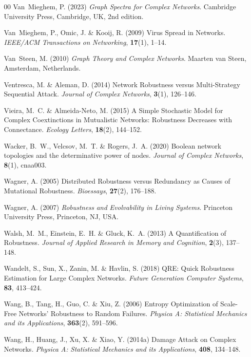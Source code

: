 \documentclass{comnet-mod}
\begin{document}
\begin{thebibliography}{00}
Van~Mieghem, P. (2023) {\em {Graph Spectra for Complex Networks}}.
{Cambridge University Press}, {Cambridge, UK}, 2nd edition.

Van~Mieghem, P., Omic, J. {\&} Kooij, R. (2009)  {Virus Spread in Networks}.
  {\em {IEEE/ACM Transactions on Networking}}, \textbf{17}(1), 1--14.

Van~Steen, M. (2010) {\em {Graph {{Theory}} and {{Complex Networks}}}}.
{Maarten van Steen}, {Amsterdam, Netherlands}.

Ventresca, M. {\&} Aleman, D. (2014)  {Network Robustness versus Multi-Strategy
  Sequential Attack}. {\em {Journal of Complex Networks}}, \textbf{3}(1),
  126--146.

Vieira, M.~C. {\&} {Almeida-Neto}, M. (2015)  {A Simple Stochastic Model for
  Complex Coextinctions in Mutualistic Networks: {{Robustness}} Decreases with
  Connectance}. {\em {Ecology Letters}}, \textbf{18}(2), 144--152.

Wacker, B.~W., Velcsov, M.~T. {\&} Rogers, J.~A. (2020)  Boolean network
  topologies and the determinative power of nodes. {\em {Journal of Complex
  Networks}}, \textbf{8}(1), cnaa003.

Wagner, A. (2005)  {Distributed Robustness versus Redundancy as Causes of
  Mutational Robustness}. {\em {Bioessays}}, \textbf{27}(2), 176--188.

Wagner, A. (2007) {\em {Robustness and Evolvability in Living Systems}}.
{Princeton University Press}, {Princeton, NJ, USA}.

Walsh, M.~M., Einstein, E.~H. {\&} Gluck, K.~A. (2013)  {A Quantification of
  Robustness}. {\em {Journal of Applied Research in Memory and Cognition}},
  \textbf{2}(3), 137--148.

Wandelt, S., Sun, X., Zanin, M. {\&} Havlin, S. (2018)  {{{QRE}}: {{Quick
  Robustness Estimation}} for Large Complex Networks}. {\em {Future Generation
  Computer Systems}}, \textbf{83}, 413--424.

Wang, B., Tang, H., Guo, C. {\&} Xiu, Z. (2006)  {Entropy Optimization of
  Scale-Free Networks' Robustness to Random Failures}. {\em {Physica A:
  Statistical Mechanics and its Applications}}, \textbf{363}(2), 591--596.

Wang, H., Huang, J., Xu, X. {\&} Xiao, Y. (2014a)  {Damage Attack on Complex
  Networks}. {\em {Physica A: Statistical Mechanics and its Applications}},
  \textbf{408}, 134--148.


\end{thebibliography}
\end{document}
